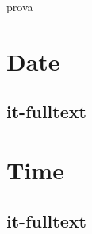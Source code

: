 \documentclass[italian]{article}
\begin{document}
 

\thispagestyle{empty}
prova
	\section{Date}
	\subsection{it-fulltext}
	
	\section{Time}
	\subsection{it-fulltext}
	
\end{document}

